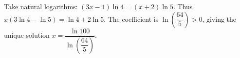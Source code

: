 Take natural logarithms: $(3x-1)\ln4=(x+2)\ln5$. Thus $x(3\ln4-\ln5)=\ln4+2\ln5$. The coefficient is $\ln(\dfrac{64}{5})>0$, giving the unique solution $\boxed{x=\dfrac{\ln100}{\ln(\dfrac{64}{5})}}$.
